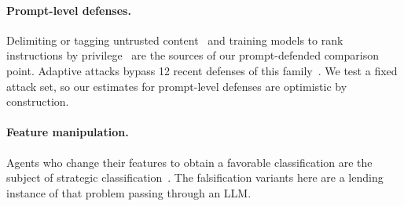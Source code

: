 \paragraph{Prompt-level defenses.} Delimiting or tagging untrusted content~\cite{hines2024} and training models to rank instructions by privilege~\cite{wallace2024} are the sources of our prompt-defended comparison point. Adaptive attacks bypass 12 recent defenses of this family~\cite{nasr2025}. We test a fixed attack set, so our estimates for prompt-level defenses are optimistic by construction.

\paragraph{Feature manipulation.} Agents who change their features to obtain a favorable classification are the subject of strategic classification~\cite{hardt2016}. The falsification variants here are a lending instance of that problem passing through an LLM.
